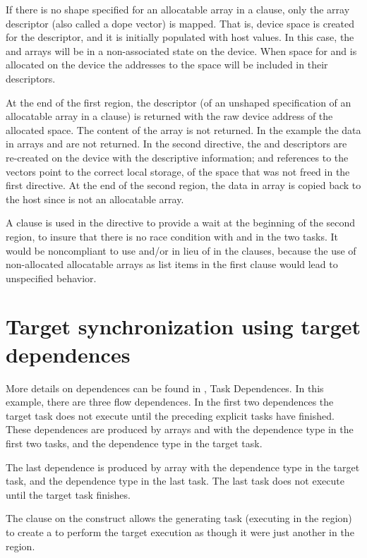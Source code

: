 If there is no shape specified for an allocatable array in a  clause, only the array descriptor
(also called a dope vector) is mapped. That is, device space is created for the descriptor, and it
is initially populated with host values. In this case, the  and  arrays will be in a
non-associated state on the device. When space for  and  is allocated on the device
the addresses to the space will be included in their descriptors.

At the end of the first  region, the descriptor (of an unshaped specification of an allocatable
array in a  clause) is returned with the raw device address of the allocated space.
The content of the array is not returned. In the example the data in arrays  and 
are not returned. In the second  directive, the  and  descriptors are
re-created on the device with the descriptive information; and references to the
vectors point to the correct local storage, of the space that was not freed in the first 
directive.  At the end of the second  region, the data in array  is copied back
to the host since  is not an allocatable array.

A  clause is used in the  directive to provide a wait at the beginning of the second 
 region, to insure that there is no race condition with  and  in the two tasks.
It would be noncompliant to use  and/or  in lieu of  in the  clauses, 
because the use of non-allocated allocatable arrays as list items in the first  clause would 
lead to unspecified behavior. 







\section{Target synchronization using target dependences}
\label{section:target_synchronization_using_target_dependences}

More details on dependences can be found in , Task Dependences. In this example,
there are three flow dependences. In the first two dependences the target task does not execute until
the preceding explicit tasks have finished. These dependences are produced by arrays  and
 with the  dependence type in the first two tasks, and the  dependence type
in the target task. 

The last dependence is produced by array  with the  dependence type in the target task,
and the  dependence type in the last task. The last task does not execute until the target task
finishes.

The  clause on the  construct allows the generating task (executing in the
 region) to create a  to perform the target execution as though it were
just another  in the region.

